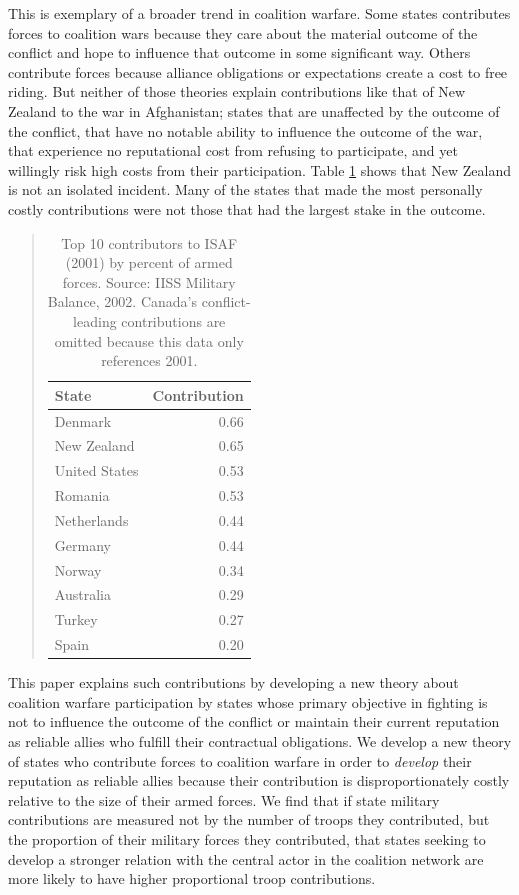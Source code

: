\documentclass[12pt,letterpaper]{article}
\begin{document}
This is exemplary of a broader trend in coalition warfare. Some states contributes forces to coalition wars because they care about the material outcome of the conflict and hope to influence that outcome in some significant way. Others contribute forces because alliance obligations or expectations create a cost to free riding. But neither of those theories explain contributions like that of New Zealand to the war in Afghanistan; states that are unaffected by the outcome of the conflict, that have no notable ability to influence the outcome of the war, that experience no reputational cost from refusing to participate, and yet willingly risk high costs from their participation. Table \ref{table:2001_top} shows that New Zealand is not an isolated incident. Many of the states that made the most personally costly contributions were not those that had the largest stake in the outcome.

	\vspace{-4em}

		\begin{quote}
		\begin{table}[ht]
			\centering
			\begin{tabular}{|lr|}
				\hline
				\textbf{State} & \textbf{Contribution} \\
				\hline
				Denmark & 0.66 \\
				New Zealand & 0.65 \\
				United States & 0.53 \\
				Romania & 0.53 \\
				Netherlands & 0.44 \\
				Germany & 0.44 \\
				Norway & 0.34 \\
				Australia & 0.29 \\
				Turkey & 0.27 \\
				Spain & 0.20 \\
				\hline
			\end{tabular}
		\caption{Top 10 contributors to ISAF (2001) by percent of armed forces. Source: IISS Military Balance, 2002. Canada's conflict-leading contributions are omitted because this data only references 2001.}
		\label{table:2001_top}
		\end{table}
		\end{quote}

	This paper explains such contributions by developing a new theory about coalition warfare participation by states whose primary objective in fighting is not to influence the outcome of the conflict or maintain their current reputation as reliable allies who fulfill their contractual obligations. We develop a new theory of states who contribute forces to coalition warfare in order to \textit{develop} their reputation as reliable allies because their contribution is disproportionately costly relative to the size of their armed forces. We find that if state military contributions are measured not by the number of troops they contributed, but the proportion of their military forces they contributed, that states seeking to develop a stronger relation with the central actor in the coalition network are more likely to have higher proportional troop contributions.
\end{document}
